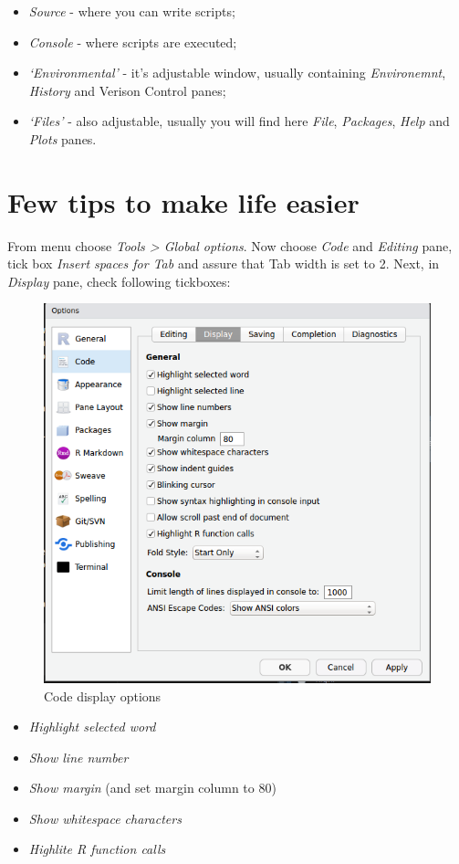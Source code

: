 \documentclass[]{book}
\providecommand{\tightlist}{%
  \setlength{\itemsep}{0pt}\setlength{\parskip}{0pt}}
\theoremstyle{definition}
\theoremstyle{definition}
\theoremstyle{definition}
\theoremstyle{remark}
\begin{document}
\begin{itemize}
\tightlist
\item
  \emph{Source} - where you can write scripts;
\item
  \emph{Console} - where scripts are executed;
\item
  \emph{`Environmental'} - it's adjustable window, usually containing
  \emph{Environemnt}, \emph{History} and Verison Control panes;
\item
  \emph{`Files'} - also adjustable, usually you will find here
  \emph{File}, \emph{Packages}, \emph{Help} and \emph{Plots} panes.
\end{itemize}

\section{Few tips to make life
easier}\label{few-tips-to-make-life-easier}

From menu choose \emph{Tools \textgreater{} Global options}. Now choose
\emph{Code} and \emph{Editing} pane, tick box \emph{Insert spaces for
Tab} and assure that Tab width is set to 2. Next, in \emph{Display}
pane, check following tickboxes:

\begin{figure}

{\centering \includegraphics[width=0.5\linewidth]{options} 

}

\caption{Code display options}\label{fig:option-settings}
\end{figure}

\begin{itemize}
\tightlist
\item
  \emph{Highlight selected word}
\item
  \emph{Show line number}
\item
  \emph{Show margin} (and set margin column to 80)
\item
  \emph{Show whitespace characters}
\item
  \emph{Highlite R function calls}
\end{itemize}
\end{document}
